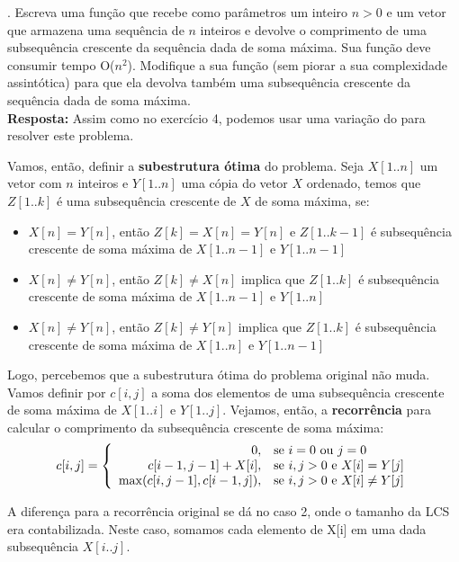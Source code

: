 
. Escreva uma função que recebe como parâmetros um inteiro $n > 0$ e um vetor que armazena uma sequência de $n$ inteiros e devolve o comprimento de uma subsequência crescente da sequência dada de soma máxima. Sua função deve consumir tempo O($n^2$). Modifique a sua função (sem piorar a sua complexidade assintótica) para que ela devolva também uma subsequência crescente da sequência dada de soma máxima.\\[6pt]

\textbf{Resposta:} Assim como no exercício 4, podemos usar uma variação do  para resolver este problema.

Vamos, então, definir a \textbf{subestrutura ótima} do problema. Seja $X[1..n]$ um vetor com $n$ inteiros e $Y[1..n]$ uma cópia do vetor $X$ ordenado, temos que $Z[1..k]$ é uma subsequência crescente de $X$ de soma máxima, se:

\begin{itemize}
  \item $X[n] = Y[n]$, então $Z[k] = X[n] = Y[n]$ e $Z[1..k-1]$ é subsequência crescente de soma máxima de $X[1..n-1]$ e $Y[1..n-1]$
  \item $X[n] \neq Y[n]$, então $Z[k] \neq X[n]$ implica que $Z[1..k]$ é subsequência crescente de soma máxima de $X[1..n-1]$ e $Y[1..n]$
  \item $X[n] \neq Y[n]$, então $Z[k] \neq Y[n]$ implica que $Z[1..k]$ é subsequência crescente de soma máxima de $X[1..n]$ e $Y[1..n-1]$
\end{itemize}

Logo, percebemos que a subestrutura ótima do problema original não muda. Vamos definir por $c[i, j]$ a soma dos elementos de uma subsequência crescente de soma máxima de $X[1..i]$ e $Y[1..j]$. Vejamos, então, a \textbf{recorrência} para calcular o comprimento da subsequência crescente de soma máxima:
\begin{align*}
c[i, j] = \left\{\begin{array}{rl}
                    0, &\mbox{se $i = 0$ ou $j = 0$} \\
                    c[i-1, j-1] + X[i], &\mbox{se $i, j > 0$ e $X[i] = Y[j]$} \\
                    \smash{\displaystyle\max (c[i, j-1], c[i-1, j])}, &\mbox{se $i, j > 0$ e $X[i] \neq Y[j]$}
                \end{array} \right.
\end{align*}

A diferença para a recorrência original se dá no caso 2, onde o tamanho da LCS era contabilizada. Neste caso, somamos cada elemento de X[i] em uma dada subsequência $X[i..j]$.

